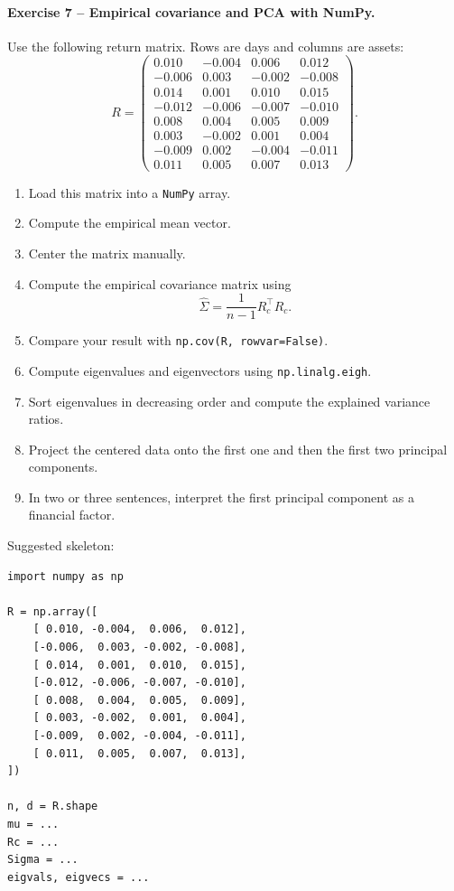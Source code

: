 \documentclass[10pt]{article}
\begin{document}
\paragraph{Exercise 7 -- Empirical covariance and PCA with NumPy.}
Use the following return matrix. Rows are days and columns are assets:
\[
R=
\begin{pmatrix}
0.010&-0.004&0.006&0.012\\
-0.006&0.003&-0.002&-0.008\\
0.014&0.001&0.010&0.015\\
-0.012&-0.006&-0.007&-0.010\\
0.008&0.004&0.005&0.009\\
0.003&-0.002&0.001&0.004\\
-0.009&0.002&-0.004&-0.011\\
0.011&0.005&0.007&0.013
\end{pmatrix}.
\]

\begin{enumerate}
\item Load this matrix into a \texttt{NumPy} array.
\item Compute the empirical mean vector.
\item Center the matrix manually.
\item Compute the empirical covariance matrix using
\[
\widehat{\Sigma}=\frac{1}{n-1}R_c^\top R_c.
\]
\item Compare your result with \texttt{np.cov(R, rowvar=False)}.
\item Compute eigenvalues and eigenvectors using \texttt{np.linalg.eigh}.
\item Sort eigenvalues in decreasing order and compute the explained variance
ratios.
\item Project the centered data onto the first one and then the first two
principal components.
\item In two or three sentences, interpret the first principal component as a
financial factor.
\end{enumerate}

Suggested skeleton:
\begin{verbatim}
import numpy as np

R = np.array([
    [ 0.010, -0.004,  0.006,  0.012],
    [-0.006,  0.003, -0.002, -0.008],
    [ 0.014,  0.001,  0.010,  0.015],
    [-0.012, -0.006, -0.007, -0.010],
    [ 0.008,  0.004,  0.005,  0.009],
    [ 0.003, -0.002,  0.001,  0.004],
    [-0.009,  0.002, -0.004, -0.011],
    [ 0.011,  0.005,  0.007,  0.013],
])

n, d = R.shape
mu = ...
Rc = ...
Sigma = ...
eigvals, eigvecs = ...
\end{verbatim}
\end{document}
